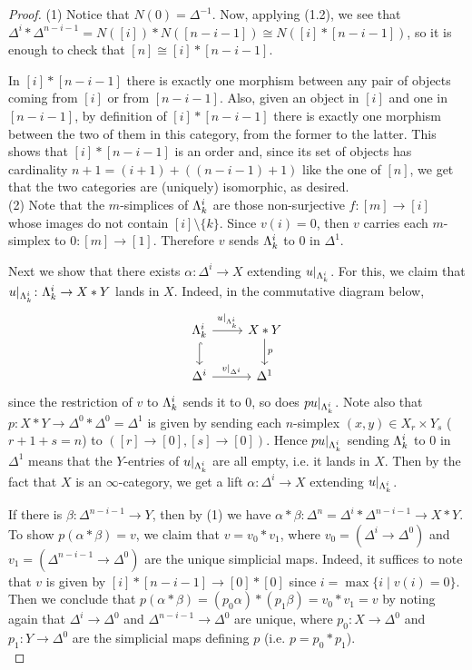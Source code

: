 \documentclass[a4paper,11pt,openany]{scrartcl}
\begin{document}
\newpage
{}
\begin{proof}
    (1) Notice that $N(0)=\Delta^{-1}$. Now, applying (1.2), we see that
    $\Delta^i*\Delta^{n-i-1}=N([i])*N([n-i-1])\cong N([i]*[n-i-1])$, so it is
    enough to check that $[n]\cong [i]*[n-i-1]$.

    In $[i]*[n-i-1]$ there is exactly one morphism between any pair of objects
    coming from $[i]$ or from $[n-i-1]$. Also, given an object in $[i]$ and one
    in $[n-i-1]$, by definition of $[i]*[n-i-1]$ there is exactly one morphism
    between the two of them in this category, from the former to the latter.
    This shows that $[i]*[n-i-1]$ is an order and, since its set of objects has
    cardinality $n+1=(i+1)+((n-i-1)+1)$ like the one of $[n]$, we get that the
    two categories are (uniquely) isomorphic, as desired. \\

    (2) Note that the $m$-simplices of $\Lambda^i_k$ are those non-surjective $f\colon[m]\to[i]$ whose images do not contain $[i]\setminus\{k\}$. Since $v(i)=0$, then $v$ carries each $m$-simplex to $0\colon[m]\to[1]$. Therefore $v$ sends $\Lambda^i_k$ to $0$ in $\Delta^1$.

Next we show that there exists $\alpha\colon\Delta^i\to X$ extending $u|_{\Lambda^i_k}$. For this, we claim that $u|_{\Lambda^i_k}\colon\Lambda^i_k\to X*Y$ lands in $X$. Indeed, in the commutative diagram below,
\[
\begin{tikzcd}
\La^i_k\arrow[r,"u|_{\Lambda^i_k}"]\arrow[d,hookrightarrow]& X*Y\arrow[d,"p"]\\
\Delta^i\arrow[r,"v|_{\Delta^i}"]& \Delta^1
\end{tikzcd}
\]
since the restriction of $v$ to $\Lambda^i_k$ sends it to $0$, so does $pu|_{\Lambda^i_k}$. Note also that $p\colon X*Y\to\Delta^0*\Delta^0=\Delta^1$ is given by sending each $n$-simplex $(x,y)\in X_r\times Y_s$ ($r+1+s=n$) to $([r]\to[0],[s]\to[0])$. Hence $pu|_{\Lambda^i_k}$ sending $\Lambda^i_k$ to $0$ in $\Delta^1$ means that the $Y$-entries of $u|_{\Lambda^i_k}$ are all empty, i.e. it lands in $X$. Then by the fact that $X$ is an $\infty$-category, we get a lift $\alpha\colon\Delta^i\to X$ extending $u|_{\Lambda^i_k}$.

If there is $\beta\colon\Delta^{n-i-1}\to Y$, then by (1) we have $\alpha*\beta\colon\Delta^n=\Delta^i*\Delta^{n-i-1}\to X*Y$. To show $p(\alpha*\beta)=v$, we claim that $v=v_0*v_1$, where $v_0=(\Delta^i\to\Delta^0)$ and $v_1=(\Delta^{n-i-1}\to\Delta^0)$ are the unique simplicial maps. Indeed, it suffices to note that  $v$ is given by $[i]*[n-i-1]\to[0]*[0]$ since $i=\max\{i\mid v(i)=0\}$. Then we conclude that $p(\alpha*\beta)=(p_0\alpha)*(p_1\beta)=v_0*v_1=v$ by noting again that $\Delta^i\to\Delta^0$ and $\Delta^{n-i-1}\to\Delta^0$ are unique, where $p_0\colon X\to\Delta^0$ and $p_1\colon Y\to\Delta^0$ are the simplicial maps defining $p$ (i.e. $p=p_0*p_1$).\\


\end{proof}
\end{document}
